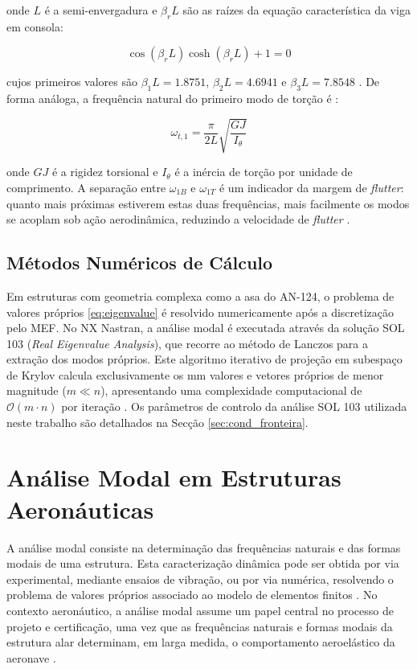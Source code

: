\documentclass[11pt,oneside,a4paper,final]{report}
\begin{document}
\noindent onde $L$ é a semi-envergadura e $\beta_r L$ são as raízes da equação característica da viga em consola:

\begin{equation}
    \cos(\beta_r L)\cosh(\beta_r L) + 1 = 0
    \label{eq:char_cantilever}
\end{equation}

cujos primeiros valores são $\beta_1 L = 1.8751$, $\beta_2 L = 4.6941$ e $\beta_3 L = 7.8548$ \cite{Rao2011}. De forma análoga, a frequência natural do primeiro modo de torção é \cite{Bisplinghoff1996}:

\begin{equation}
    \omega_{t,1} = \frac{\pi}{2L}
    \sqrt{\frac{GJ}{I_\theta}}
    \label{eq:freq_torcao}
\end{equation}

\noindent onde $GJ$ é a rigidez torsional e $I_\theta$ é a inércia de torção por unidade de comprimento. A separação entre $\omega_{1B}$ e $\omega_{1T}$ é um indicador da margem de \textit{flutter}: quanto mais próximas estiverem estas duas frequências, mais facilmente os modos se acoplam sob ação aerodinâmica, reduzindo a velocidade de \textit{flutter} \cite{Fung1993, Dowell2004}.

\subsection{Métodos Numéricos de Cálculo}

Em estruturas com geometria complexa como a asa do AN-124, o problema de valores próprios \eqref{eq:eigenvalue} é resolvido numericamente após a discretização pelo MEF. No NX Nastran, a análise modal é executada através da solução SOL 103 (\textit{Real Eigenvalue Analysis}), que recorre ao método de Lanczos para a extração dos modos próprios. Este algoritmo iterativo de projeção em subespaço de Krylov calcula exclusivamente os mm valores e vetores próprios de menor magnitude ($m \ll n$), apresentando uma complexidade computacional de $\mathcal{O}(m \cdot n)$ por iteração \cite{Nastran2014, Bathe2014}. Os parâmetros de controlo da análise SOL 103 utilizada neste trabalho são detalhados na Secção \ref{sec:cond_fronteira}.

\section{Análise Modal em Estruturas Aeronáuticas}
\label{sec:analise_modal_aero}

A análise modal consiste na determinação das frequências naturais e das formas modais de uma estrutura. Esta caracterização dinâmica pode ser obtida por via experimental, mediante ensaios de vibração, ou por via numérica, resolvendo o problema de valores próprios associado ao modelo de elementos finitos \cite{Ewins2000, Maia1997}. No contexto aeronáutico, a análise modal assume um papel central no processo de projeto e certificação, uma vez que as frequências naturais e formas modais da estrutura alar determinam, em larga medida, o comportamento aeroelástico da aeronave \cite{Wright2015}.
\end{document}
